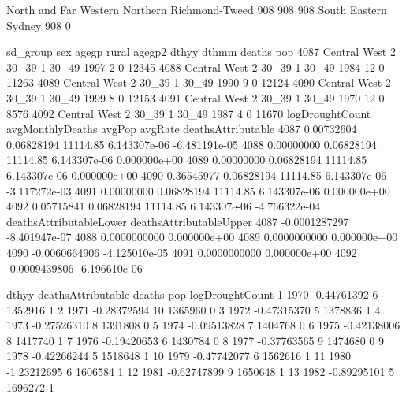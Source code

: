 \documentclass[a4paper]{article}                %
\begin{document}
\begin{Schunk}
\begin{Soutput}
North and Far Western              Northern        Richmond-Tweed 
                  908                   908                   908 
        South Eastern                Sydney 
                  908                     0 
\end{Soutput}
\begin{Soutput}
         sd_group sex agegp rural agegp2 dthyy dthmm deaths   pop
4087 Central West   2 30_39     1  30_49  1997     2      0 12345
4088 Central West   2 30_39     1  30_49  1984    12      0 11263
4089 Central West   2 30_39     1  30_49  1990     9      0 12124
4090 Central West   2 30_39     1  30_49  1999     8      0 12153
4091 Central West   2 30_39     1  30_49  1970    12      0  8576
4092 Central West   2 30_39     1  30_49  1987     4      0 11670
     logDroughtCount avgMonthlyDeaths   avgPop      avgRate deathsAttributable
4087      0.00732604       0.06828194 11114.85 6.143307e-06      -6.481191e-05
4088      0.00000000       0.06828194 11114.85 6.143307e-06       0.000000e+00
4089      0.00000000       0.06828194 11114.85 6.143307e-06       0.000000e+00
4090      0.36545977       0.06828194 11114.85 6.143307e-06      -3.117272e-03
4091      0.00000000       0.06828194 11114.85 6.143307e-06       0.000000e+00
4092      0.05715841       0.06828194 11114.85 6.143307e-06      -4.766322e-04
     deathsAttributableLower deathsAttributableUpper
4087           -0.0001287297           -8.401947e-07
4088            0.0000000000            0.000000e+00
4089            0.0000000000            0.000000e+00
4090           -0.0060664906           -4.125010e-05
4091            0.0000000000            0.000000e+00
4092           -0.0009439806           -6.196610e-06
\end{Soutput}
\begin{Soutput}
   dthyy deathsAttributable deaths     pop logDroughtCount
1   1970        -0.44761392      6 1352916               1
2   1971        -0.28372594     10 1365960               0
3   1972        -0.47315370      5 1378836               1
4   1973        -0.27526310      8 1391808               0
5   1974        -0.09513828      7 1404768               0
6   1975        -0.42138006      8 1417740               1
7   1976        -0.19420653      6 1430784               0
8   1977        -0.37763565      9 1474680               0
9   1978        -0.42266244      5 1518648               1
10  1979        -0.47742077      6 1562616               1
11  1980        -1.23212695      6 1606584               1
12  1981        -0.62747899      9 1650648               1
13  1982        -0.89295101      5 1696272               1

\end{Soutput}
\end{Schunk}
\end{document}
